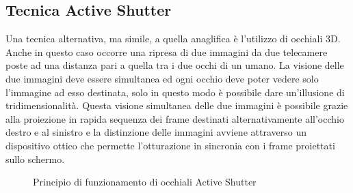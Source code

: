 \documentclass[12pt,a4paper,openright,twoside]{book}
\begin{document}
    \subsection{Tecnica Active Shutter}
    Una tecnica alternativa, ma simile, a quella anaglifica è l'utilizzo di occhiali 3D.\\
    Anche in questo caso occorre una ripresa di due immagini da due telecamere poste ad una distanza pari a quella tra i due occhi di un umano. La visione delle due immagini deve essere simultanea ed ogni occhio deve poter vedere solo l'immagine ad esso destinata, solo in questo modo è possibile dare un'illusione di tridimensionalità. Questa visione simultanea delle due immagini è possibile grazie alla proiezione in rapida sequenza dei frame destinati alternativamente all'occhio destro e al sinistro e la distinzione delle immagini avviene attraverso un dispositivo ottico che permette l'otturazione in sincronia con i frame proiettati sullo schermo.\cite{wiki:3dglass} \\
     \begin{figure}[h]
    	\centering
    	 \quad
    	\caption{Principio di funzionamento di occhiali Active Shutter}
    	\label{fig:shutter}
    \end{figure}
\end{document}
